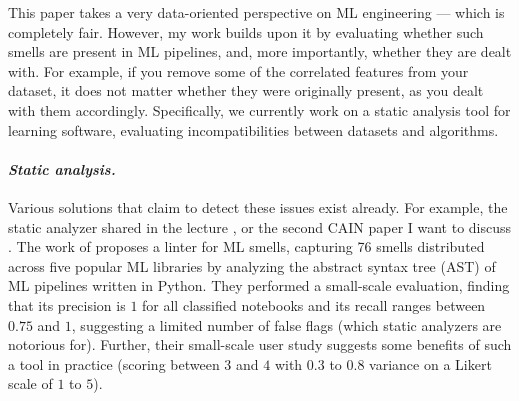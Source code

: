     This paper takes a very data-oriented perspective on ML engineering --- which is completely fair.
    However, my work \citep{meijer_contract_2024} builds upon it by evaluating whether such smells are present in ML pipelines, and, more importantly, whether they are dealt with.
    For example, if you remove some of the correlated features from your dataset, it does not matter whether they were originally present, as you dealt with them accordingly.
    Specifically, we currently work on a static analysis tool for learning software, evaluating incompatibilities between datasets and algorithms.

    \paragraph{\textit{Static analysis.}} Various solutions that claim to detect these issues exist already.
    For example, the static analyzer shared in the lecture \citep{quaranta2024pynblint}, or the second CAIN paper I want to discuss \citep{shivashankar2025mlscent}.
    The work of \citet{shivashankar2025mlscent} proposes a linter for ML smells, capturing 76 smells distributed across five popular ML libraries by analyzing the abstract syntax tree (AST) of ML pipelines written in Python.
    They performed a small-scale evaluation, finding that its precision is $1$ for all classified notebooks and its recall ranges between $0.75$ and $1$, suggesting a limited number of false flags (which static analyzers are notorious for).
    Further, their small-scale user study suggests some benefits of such a tool in practice (scoring between $3$ and $4$ with $0.3$ to $0.8$ variance on a Likert scale of $1$ to $5$).
    
